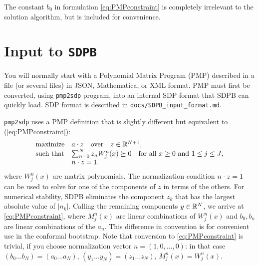 \documentclass[12pt]{article}
\numberwithin{equation}{section}
\renewcommand{\be}{\begin{eqnarray}}
\renewcommand{\ee}{\end{eqnarray}}
\newcommand\SDPB{\texttt{SDPB}}
\begin{document}
The constant $b_0$ in formulation \eqref{eq:PMPconstraint} is completely irrelevant to the solution algorithm, but is included for convenience.

\section{Input to \SDPB}
You will normally start with a Polynomial Matrix Program (PMP) described in a file (or several files) in JSON, Mathematica, or XML format.
PMP must first be converted, using \texttt{pmp2sdp} program, into an internal SDP format
that SDPB can quickly load. SDP format is described in \texttt{docs/SDPB\_input\_format.md}.


\texttt{pmp2sdp} uses a PMP definition that is slightly different but equivalent to (\ref{eq:PMPconstraint}):
\be
\label{eq:PMPconstraintMathematica}
\begin{array}{ll}
	\textrm{maximize} & a\.z\quad\textrm{over}\quad z \in \R^{N+1},\\
	\textrm{such that} & \sum_{n=0}^{N} z_n W^n_j(x) \succeq 0 \quad \textrm{for all $x\geq 0$ and $1 \leq j \leq J$},\\
	& n\.z = 1.
\end{array}
\ee
where $W_j^n(x)$ are matrix polynomials.  The normalization condition $n\.z=1$ can be used to solve for one of the components of $z$ in terms of the others. 
For numerical stability, SDPB eliminates the component $z_k$ that has the largest absolute value of $|n_k|$.
Calling the remaining components $y\in \R^N$, we arrive at \eqref{eq:PMPconstraint}, where $M_j^n(x)$ are linear combinations of $W^n_j(x)$ and $b_0,b_n$ are linear combinations of the $a_n$.  This difference in convention is for convenient use in the conformal bootstrap. Note that conversion to \eqref{eq:PMPconstraint} is trivial, if you choose normalization vector $n=(1,0,\ldots,0)$: in that case $(b_0\ldots b_N) = (a_0\ldots a_N)$, $(y_1\ldots y_N) = (z_1\ldots z_N)$, $M^n_j(x) = W^n_j(x)$.
\end{document}
